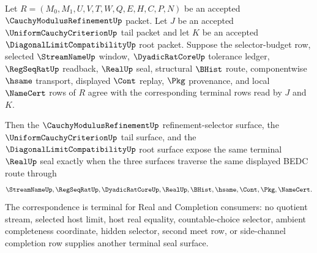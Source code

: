 \begin{theorem}
\label{thm:cauchy-modulus-refinement-uniform-diagonal-seal-correspondence}
Let $R=(M_0,M_1,U,V,T,W,Q,E,H,C,P,N)$ be an accepted $\CauchyModulusRefinementUp$ packet. Let $J$ be an accepted $\UniformCauchyCriterionUp$ tail packet and let $K$ be an accepted $\DiagonalLimitCompatibilityUp$ root packet. Suppose the selector-budget row, selected $\StreamNameUp$ window, $\DyadicRatCoreUp$ tolerance ledger, $\RegSeqRatUp$ readback, $\RealUp$ seal, structural $\BHist$ route, componentwise $\hsame$ transport, displayed $\Cont$ replay, $\Pkg$ provenance, and local $\NameCert$ rows of $R$ agree with the corresponding terminal rows read by $J$ and $K$.

Then the $\CauchyModulusRefinementUp$ refinement-selector surface, the $\UniformCauchyCriterionUp$ tail surface, and the $\DiagonalLimitCompatibilityUp$ root surface expose the same terminal $\RealUp$ seal exactly when the three surfaces traverse the same displayed BEDC route through
$$
\StreamNameUp,\RegSeqRatUp,\DyadicRatCoreUp,\RealUp,\BHist,\hsame,\Cont,\Pkg,\NameCert.
$$
The correspondence is terminal for Real and Completion consumers: no quotient stream, selected host limit, host real equality, countable-choice selector, ambient completeness coordinate, hidden selector, second meet row, or side-channel completion row supplies another terminal seal surface.
\end{theorem}
